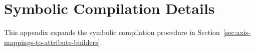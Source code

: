 \section{Symbolic Compilation Details}
\label{app:symbolic-compilation-details}
This appendix expands the symbolic compilation procedure in
Section~\ref{sec:axis-mappings-to-attribute-builders}.


\FloatBarrier

\FloatBarrier

\FloatBarrier

\FloatBarrier

